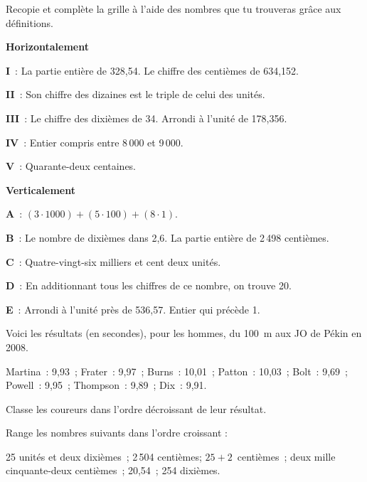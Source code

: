 \begin{exercice}
Recopie et complète la grille à l'aide des nombres que tu trouveras grâce aux définitions.
\vspace{0.75em}

\textbf{Horizontalement}

\textbf{I} : La partie entière de 328,54. Le chiffre des centièmes de 634,152.

\textbf{II} : Son chiffre des dizaines est le triple de celui des unités.

\textbf{III} : Le chiffre des dixièmes de 34. Arrondi à l'unité de 178,356.

\textbf{IV} : Entier compris entre 8\,000 et 9\,000.

\textbf{V} : Quarante-deux centaines.

\vspace{0.75em}

\textbf{Verticalement}

\textbf{A} : $(3 \cdot 1 000) + (5 \cdot 100) + (8 \cdot 1)$.

\textbf{B} : Le nombre de dixièmes dans 2,6. La partie entière de 2\,498 centièmes.

\textbf{C} : Quatre-vingt-six milliers et cent deux unités.

\textbf{D} : En additionnant tous les chiffres de ce nombre, on trouve 20.

\textbf{E} : Arrondi à l'unité près de 536,57. Entier qui précède 1.

\end{exercice}


\begin{exercice}
Voici les résultats (en secondes), pour les hommes, du 100 m aux JO de Pékin en 2008. \vspace{0.75em}

Martina : 9,93 ; Frater : 9,97 ; Burns : 10,01 ; Patton : 10,03 ; Bolt : 9,69 ; Powell : 9,95 ; Thompson : 9,89 ; Dix : 9,91.\vspace{0.75em}

Classe les coureurs dans l'ordre décroissant de leur résultat.
\end{exercice}


\begin{exercice}[À ordonner]
Range les nombres suivants dans l'ordre croissant : \vspace{0.75em}

25 unités et deux dixièmes ; 2\,504 centièmes; $25 + 2$ centièmes ; deux mille cinquante‑deux centièmes ; 20,54 ; 254 dixièmes.
\end{exercice}


